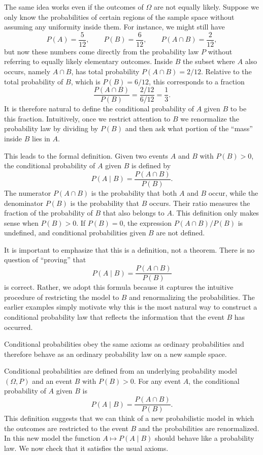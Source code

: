 The same idea works even if the outcomes of \(\Omega\) are not equally likely. Suppose we only know the probabilities of certain regions of the sample space without assuming any uniformity inside them. For instance, we might still have
\[
P(A) = \frac{5}{12}, \qquad P(B) = \frac{6}{12}, \qquad P(A \cap B) = \frac{2}{12},
\]
but now these numbers come directly from the probability law \(P\) without referring to equally likely elementary outcomes. Inside \(B\) the subset where \(A\) also occurs, namely \(A \cap B\), has total probability \(P(A \cap B) = 2/12\). Relative to the total probability of \(B\), which is \(P(B) = 6/12\), this corresponds to a fraction
\[
\frac{P(A \cap B)}{P(B)} = \frac{2/12}{6/12} = \frac{1}{3}.
\]
It is therefore natural to define the conditional probability of \(A\) given \(B\) to be this fraction. Intuitively, once we restrict attention to \(B\) we renormalize the probability law by dividing by \(P(B)\) and then ask what portion of the “mass” inside \(B\) lies in \(A\).

This leads to the formal definition. Given two events \(A\) and \(B\) with \(P(B) > 0\), the conditional probability of \(A\) given \(B\) is defined by
\[
P(A \mid B) = \frac{P(A \cap B)}{P(B)}.
\]
The numerator \(P(A \cap B)\) is the probability that both \(A\) and \(B\) occur, while the denominator \(P(B)\) is the probability that \(B\) occurs. Their ratio measures the fraction of the probability of \(B\) that also belongs to \(A\). This definition only makes sense when \(P(B) > 0\). If \(P(B) = 0\), the expression \(P(A \cap B) / P(B)\) is undefined, and conditional probabilities given \(B\) are not defined.

It is important to emphasize that this is a definition, not a theorem. There is no question of “proving” that
\[
P(A \mid B) = \frac{P(A \cap B)}{P(B)}
\]
is correct. Rather, we adopt this formula because it captures the intuitive procedure of restricting the model to \(B\) and renormalizing the probabilities. The earlier examples simply motivate why this is the most natural way to construct a conditional probability law that reflects the information that the event \(B\) has occurred.


Conditional probabilities obey the same axioms as ordinary probabilities and therefore behave as an ordinary probability law on a new sample space.

Conditional probabilities are defined from an underlying probability model \((\Omega, P)\) and an event \(B\) with \(P(B) > 0\). For any event \(A\), the conditional probability of \(A\) given \(B\) is
\[
P(A \mid B) = \frac{P(A \cap B)}{P(B)}.
\]
This definition suggests that we can think of a new probabilistic model in which the outcomes are restricted to the event \(B\) and the probabilities are renormalized. In this new model the function \(A \mapsto P(A \mid B)\) should behave like a probability law. We now check that it satisfies the usual axioms.

